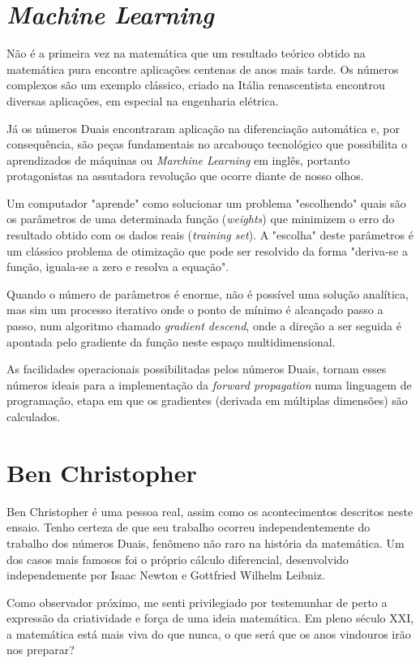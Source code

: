 \documentclass{article}
\begin{document}
\section*{\textit{Machine Learning}}

Não é a primeira vez na matemática que um resultado teórico obtido na matemática pura encontre aplicações centenas de anos mais tarde. Os números complexos são um exemplo clássico, criado na Itália renascentista encontrou diversas aplicações, em especial na engenharia elétrica. 

Já os números Duais encontraram aplicação na diferenciação automática e, por consequência, são peças fundamentais no arcabouço tecnológico que possibilita o aprendizados de máquinas ou \textit{Marchine Learning} em inglês, portanto protagonistas na assutadora revolução que ocorre diante de nosso olhos. 

Um computador "aprende" como solucionar um problema "escolhendo" quais são os parâmetros de uma determinada função (\textit{weights}) que minimizem o erro do resultado obtido com os dados reais (\textit{training set}). A "escolha" deste parâmetros é um clássico problema de otimização que pode ser resolvido da forma "deriva-se a função, iguala-se a zero e resolva a equação". 

Quando o número de parâmetros é enorme, não é possível uma solução analítica, mas sim um processo iterativo onde o ponto de mínimo é alcançado passo a passo, num algoritmo chamado \textit{gradient descend}, onde a direção a ser seguida é apontada pelo gradiente da função neste espaço multidimensional.

As facilidades operacionais possibilitadas pelos números Duais, tornam esses números ideais para a implementação da \textit{forward propagation} numa linguagem de programação, etapa em que os gradientes (derivada em múltiplas dimensões) são calculados. 

\section*{Ben Christopher}

Ben Christopher é uma pessoa real, assim como os acontecimentos descritos neste ensaio. Tenho certeza de que seu trabalho ocorreu independentemente do trabalho dos números Duais, fenômeno não raro na história da matemática. Um dos casos mais famosos foi o próprio cálculo diferencial, desenvolvido independemente por Isaac Newton e Gottfried Wilhelm Leibniz.

Como observador próximo, me senti privilegiado por testemunhar de perto a expressão da criatividade e força de uma ideia matemática. Em pleno século XXI, a matemática está mais viva do que nunca, o que será que os anos vindouros irão nos preparar?
\end{document}
